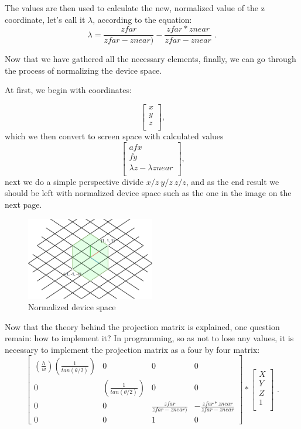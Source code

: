 The values are then used to calculate the new, normalized value of the z coordinate, let's call it $\lambda$, according to the equation:
\begin{equation}
\lambda=\frac{zfar}{zfar - znear)}
-
\frac{zfar * znear}{zfar-znear}
\text{ .}
\label{zequation}
\end{equation} 

Now that we have gathered all the necessary elements, finally, we can go through the process of normalizing the device space.

At first, we begin with coordinates:

\[
\begin{bmatrix}
x\\
y\\
z\\
\end{bmatrix}
\text{,}
\]
which we then convert to screen space with calculated values 
\[
\begin{bmatrix}
afx\\
fy\\
\lambda z-\lambda znear\\
\end{bmatrix}
\text{,}
\]
next we do a simple perspective divide $x/z\ y/z\ z/z$, and as the end result we should be left with normalized device space such as the one in the image on the next page.


\begin{figure}[H]
  \begin{center}
  \includegraphics[width=0.5\textwidth]{figures/space.png}  
  \end{center}
  \caption{Normalized device space}
\end{figure}

Now that the theory behind the projection matrix is explained, one question remain: how to implement it? In programming, so as not to lose any values, it is necessary to implement the projection matrix as a four by four matrix: 
\begin{equation}
\begin{bmatrix}
(\frac{h}{w})(\frac{1}{tan(\theta/2)}) & 0 & 0 & 0\\
0 & (\frac{1}{tan(\theta/2)}) & 0 & 0\\
0 & 0 & \frac{zfar}{zfar - znear)} & -\frac{zfar * znear}{zfar-znear}\\
0 & 0 & 1 & 0
\end{bmatrix} 
*
\begin{bmatrix}
X\\
Y\\
Z\\
1\\
\end{bmatrix} 
\text{ .}
\label{projectionmatrixequation}
\end{equation} 


